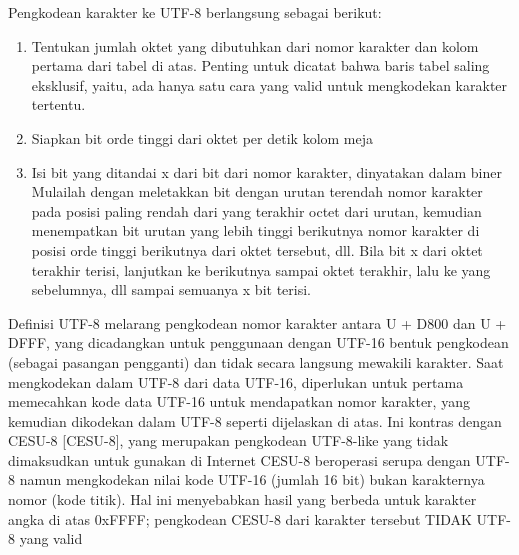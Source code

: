    Pengkodean karakter ke UTF-8 berlangsung sebagai berikut:
   \begin{enumerate}
   	\item Tentukan jumlah oktet yang dibutuhkan dari nomor karakter
       dan kolom pertama dari tabel di atas. Penting untuk dicatat
       bahwa baris tabel saling eksklusif, yaitu, ada
       hanya satu cara yang valid untuk mengkodekan karakter tertentu.
    \item Siapkan bit orde tinggi dari oktet per detik
       kolom meja
    \item Isi bit yang ditandai x dari bit dari nomor karakter,
       dinyatakan dalam biner Mulailah dengan meletakkan bit dengan urutan terendah
       nomor karakter pada posisi paling rendah dari yang terakhir
       octet dari urutan, kemudian menempatkan bit urutan yang lebih tinggi berikutnya
       nomor karakter di posisi orde tinggi berikutnya dari oktet tersebut,
       dll. Bila bit x dari oktet terakhir terisi, lanjutkan ke
       berikutnya sampai oktet terakhir, lalu ke yang sebelumnya, dll sampai semuanya
       x bit terisi.
    \end{enumerate}

    Definisi UTF-8 melarang pengkodean nomor karakter antara
   U + D800 dan U + DFFF, yang dicadangkan untuk penggunaan dengan UTF-16
   bentuk pengkodean (sebagai pasangan pengganti) dan tidak secara langsung mewakili
   karakter. Saat mengkodekan dalam UTF-8 dari data UTF-16, diperlukan
   untuk pertama memecahkan kode data UTF-16 untuk mendapatkan nomor karakter, yang
   kemudian dikodekan dalam UTF-8 seperti dijelaskan di atas. Ini kontras dengan
   CESU-8 [CESU-8], yang merupakan pengkodean UTF-8-like yang tidak dimaksudkan untuk
   gunakan di Internet CESU-8 beroperasi serupa dengan UTF-8 namun mengkodekan
   nilai kode UTF-16 (jumlah 16 bit) bukan karakternya
   nomor (kode titik). Hal ini menyebabkan hasil yang berbeda untuk karakter
   angka di atas 0xFFFF; pengkodean CESU-8 dari karakter tersebut TIDAK
   UTF-8 yang valid

